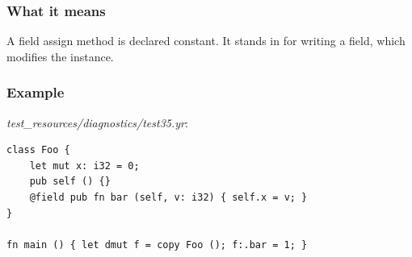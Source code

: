 \subsubsection*{What it means}

A field assign method is declared constant. It stands in for writing a field, which modifies the instance.

\subsubsection*{Example}

\textit{test\_\allowbreak{}resources/\allowbreak{}diagnostics/\allowbreak{}test35.yr}:

\begin{lstlisting}[style=coloredverbatimError]
class Foo {
    let mut x: i32 = 0;
    pub self () {}
    @field pub fn bar (self, v: i32) { self.x = v; }
}

fn main () { let dmut f = copy Foo (); f:.bar = 1; }
\end{lstlisting}

